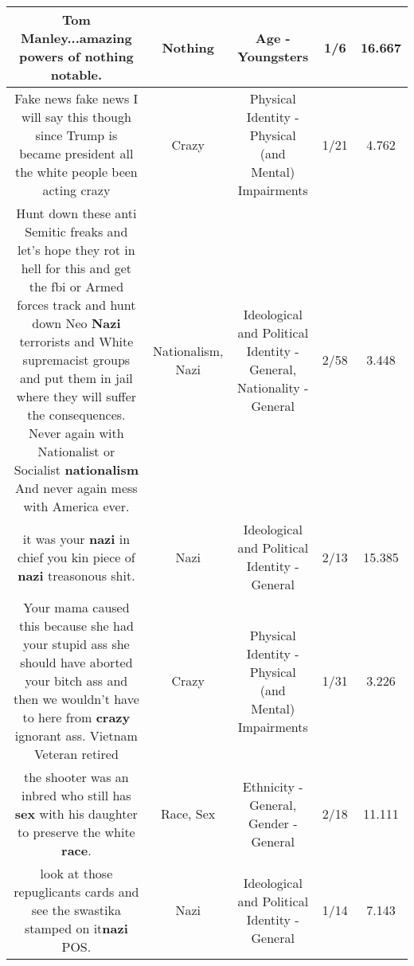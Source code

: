 \documentclass[11pt]{article}
\newlength\mylength
\begin{document}
\begin{center}
\begin{longtable}{|C{.65\mylength}|C{.30\mylength}|C{.12\mylength}|C{.12\mylength}|C{.12\mylength}|}
  \small Tom Manley...amazing powers of \textbf{nothing} notable.\normalsize   & Nothing & Age - Youngsters & 1/6 & 16.667 \\  \hline
  \small Fake news fake news I will say this though since Trump is became president all the white people been acting crazy\normalsize   & Crazy & Physical Identity - Physical (and Mental) Impairments & 1/21 & 4.762 \\  \hline
  \small Hunt down these anti Semitic freaks and let's hope they rot in hell for this and get the fbi or Armed forces track and hunt down Neo \textbf{Nazi} terrorists and White supremacist groups and put them in jail where they will suffer the consequences. Never again with Nationalist or Socialist \textbf{nationalism} And never again mess with America ever.\normalsize   & Nationalism, Nazi &  Ideological and Political Identity - General, Nationality - General & 2/58 & 3.448 \\  \hline
  \small it was your \textbf{nazi} in chief you kin piece of \textbf{nazi} treasonous shit.\normalsize   & Nazi &  Ideological and Political Identity - General & 2/13 & 15.385 \\  \hline
  \small Your mama caused this because she had your stupid ass she should have aborted your bitch ass and then we wouldn't have to here from \textbf{crazy} ignorant ass. Vietnam Veteran retired\normalsize   & Crazy & Physical Identity - Physical (and Mental) Impairments & 1/31 & 3.226 \\  \hline
  \small {} the shooter was an inbred who still has \textbf{sex} with his daughter to preserve the white \textbf{race}.\normalsize   & Race, Sex & Ethnicity - General, Gender - General & 2/18 & 11.111 \\  \hline
  \small look at those repuglicants cards and see the swastika stamped on it\textbf{nazi} POS.\normalsize   & Nazi &  Ideological and Political Identity - General & 1/14 & 7.143 \\  \hline

\end{longtable}
\end{center}
\end{document}
